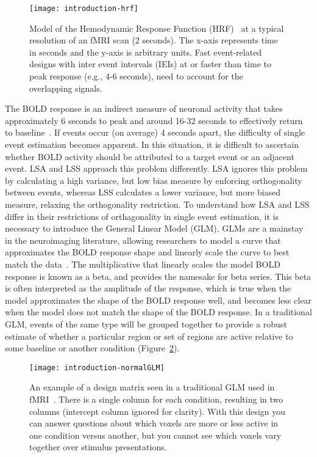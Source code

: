 \documentclass[phd,appendix,figures]{uithesis}
\begin{document}
\begin{figure}[H]
  \centering
  \texttt{[image: introduction-hrf]}
  \caption{
    Model of the Hemodynamic Response Function (HRF)~\cite{Glover1999} at a
    typical resolution of an fMRI scan (2 seconds).
    The x-axis represents time in seconds and the y-axis is arbitrary units.
    Fast event-related designs with inter event intervals (IEIs) at or faster than time to peak
    response (e.g., 4-6 seconds), need to account for the overlapping signals.
  }
  \label{fig:introhrf}
\end{figure}

The BOLD response is an indirect measure of neuronal activity that takes approximately 6 seconds to
peak and around 16-32 seconds to effectively return to baseline~\cite{Glover1999}.
If events occur (on average) 4 seconds apart, the difficulty of single event estimation
becomes apparent.
In this situation, it is difficult to ascertain whether BOLD activity should be attributed to a target event or an
adjacent event.
LSA and LSS approach this problem differently.
LSA ignores this problem by calculating a high variance, but low bias measure by enforcing orthogonality
between events,
whereas LSS calculates a lower variance, but more biased measure, relaxing the orthogonality restriction.
To understand how LSA and LSS differ in their restrictions of orthagonality in single event estimation,
it is necessary to introduce the General Linear Model (GLM).
GLMs are a mainstay in the neuroimaging literature, allowing researchers to model
a curve that approximates the BOLD response shape and linearly scale the curve
to best match the data~\cite{Friston1995}.
The multiplicative that linearly scales the model BOLD response is known as a beta,
and provides the namesake for beta series.
This beta is often interpreted as the amplitude of the response, which is true when the
model approximates the shape of the BOLD response well, and becomes less clear when
the model does not match the shape of the BOLD response.
In a traditional GLM, events of the same type will be grouped together
to provide a robust estimate of whether a particular region or set of regions are
active relative to some baseline or another condition (Figure~\ref{fig:introGLM}).

\begin{figure}[H]
  \centering
  \texttt{[image: introduction-normalGLM]}
  \caption{
    An example of a design matrix seen in a traditional GLM used in fMRI~\cite{Friston1995}.
    There is a single column for each condition, resulting in two columns (intercept column ignored for clarity).
    With this design you can answer questions about which voxels are more or less active in one condition
    versus another, but you cannot see which voxels vary together over stimulus presentations.
  }
  \label{fig:introGLM}
\end{figure}
\end{document}
